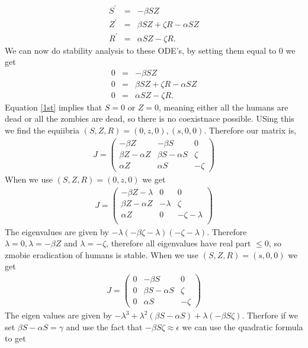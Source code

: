 \documentclass{mm2}
\numberwithin{equation}{section}
\theoremstyle{definition}
\begin{document}
\begin{eqnarray}
S^{'} &=& - \beta SZ \nonumber \\
Z^{'} &=& \beta SZ + \zeta R - \alpha SZ \nonumber \\
R^{'} &=& \alpha SZ - \zeta R.
\end{eqnarray}
We can now do stability analysis to these ODE's, by setting them equal to 0 we get 
\begin{eqnarray}
0 &=& - \beta SZ 
\label{1st} \\
0 &=& \beta SZ + \zeta R - \alpha SZ \\
0 &=& \alpha SZ - \zeta R.
\end{eqnarray}
Equation \ref{1st} implies that $S=0$ or $Z=0$, meaning either all the humans are dead or all the zombies are dead, so there is no coexistnace possible. USing this we find the equiibria $(S, Z, R) = (0, z, 0), (s, 0, 0)$. Therefore our matrix is, 
\begin{eqnarray}
J = 
\begin{pmatrix}
-\beta Z & - \beta S & 0 \\
\beta Z - \alpha Z & \beta S - \alpha S & \zeta \\
\alpha Z & \alpha S & - \zeta
\end{pmatrix}
\end{eqnarray}
When we use $(S, Z, R) = (0, z, 0)$ we get 
\begin{eqnarray}
J = 
\begin{pmatrix}
-\beta Z - \lambda & 0 & 0 \\
\beta Z - \alpha Z & - \lambda & \zeta \\
\alpha Z & 0 & - \zeta - \lambda\\
\end{pmatrix}
\end{eqnarray} 
The eigenvalues are given by $-\lambda(-\beta \zeta - \lambda)(-\zeta - \lambda)$. Therefore $\lambda= 0, \lambda= -\beta Z$ and $\lambda =-\zeta$, therefore all eigenvalues have real part $\le 0$, so zmobie eradication of humans is stable. 
When we use $(S, Z, R) = (s, 0, 0)$ we get 
\begin{eqnarray}
J = 
\begin{pmatrix}
0 &  -\beta S & 0 \\
0 & \beta S - \alpha S & \zeta \\
0 & \alpha S & - \zeta
\end{pmatrix}
\end{eqnarray} 
The eigen values are given by $-\lambda ^3+ \lambda^2(\beta S - \alpha S) + \lambda(-\beta S \zeta)$. Therfore if we set $\beta S - \alpha S = \gamma$ and use the fact that $-\beta S \zeta \approx \epsilon$ we can use the quadratic formula to get
\end{document}
